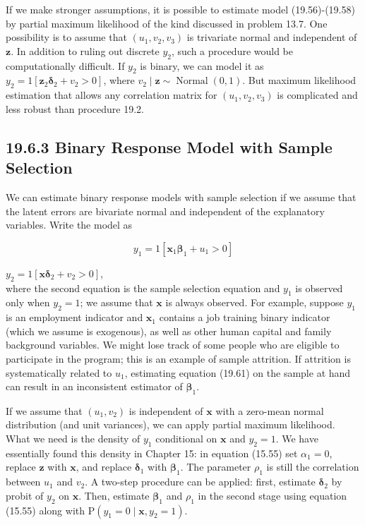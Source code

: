 \documentclass[10pt]{article}
\begin{document}
If we make stronger assumptions, it is possible to estimate model (19.56)-(19.58) by partial maximum likelihood of the kind discussed in problem 13.7. One possibility is to assume that $\left(u_{1}, v_{2}, v_{3}\right)$ is trivariate normal and independent of $\mathbf{z}$. In addition to ruling out discrete $y_{2}$, such a procedure would be computationally difficult. If $y_{2}$ is binary, we can model it as $y_{2}=1\left[\mathbf{z}_{2} \boldsymbol{\delta}_{2}+v_{2}>0\right]$, where $v_{2} \mid \mathbf{z} \sim \operatorname{Normal}(0,1)$. But maximum likelihood estimation that allows any correlation matrix for $\left(u_{1}, v_{2}, v_{3}\right)$ is complicated and less robust than procedure 19.2.

\subsection*{19.6.3 Binary Response Model with Sample Selection}
We can estimate binary response models with sample selection if we assume that the latent errors are bivariate normal and independent of the explanatory variables. Write the model as


\begin{equation*}
y_{1}=1\left[\mathbf{x}_{1} \boldsymbol{\beta}_{1}+u_{1}>0\right] \tag{19.61}
\end{equation*}


$y_{2}=1\left[\mathbf{x} \boldsymbol{\delta}_{2}+v_{2}>0\right]$,\\
where the second equation is the sample selection equation and $y_{1}$ is observed only when $y_{2}=1$; we assume that $\mathbf{x}$ is always observed. For example, suppose $y_{1}$ is an employment indicator and $\mathbf{x}_{1}$ contains a job training binary indicator (which we assume is exogenous), as well as other human capital and family background variables. We might lose track of some people who are eligible to participate in the program; this is an example of sample attrition. If attrition is systematically related to $u_{1}$, estimating equation (19.61) on the sample at hand can result in an inconsistent estimator of $\boldsymbol{\beta}_{1}$.

If we assume that $\left(u_{1}, v_{2}\right)$ is independent of $\mathbf{x}$ with a zero-mean normal distribution (and unit variances), we can apply partial maximum likelihood. What we need is the density of $y_{1}$ conditional on $\mathbf{x}$ and $y_{2}=1$. We have essentially found this density in Chapter 15: in equation (15.55) set $\alpha_{1}=0$, replace $\mathbf{z}$ with $\mathbf{x}$, and replace $\boldsymbol{\delta}_{1}$ with $\boldsymbol{\beta}_{1}$. The parameter $\rho_{1}$ is still the correlation between $u_{1}$ and $v_{2}$. A two-step procedure can be applied: first, estimate $\boldsymbol{\delta}_{2}$ by probit of $y_{2}$ on $\mathbf{x}$. Then, estimate $\boldsymbol{\beta}_{1}$ and $\rho_{1}$ in the second stage using equation (15.55) along with $\mathrm{P}\left(y_{1}=0 \mid \mathbf{x}, y_{2}=1\right)$.
\end{document}
